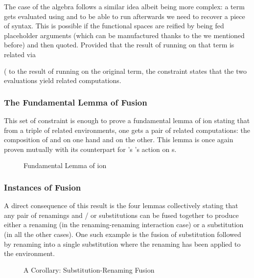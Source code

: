 
The case of the algebra follows a similar idea albeit being more complex:
a term gets evaluated using  and to be able to run 
afterwards we need to recover a piece of syntax. This is possible if the
 functional spaces are reified by being fed placeholder  arguments
(which can be manufactured thanks to the  we mentioned before) and
then quoted. Provided that the result of running  on that term is
related via {   (   to the result
of running  on the original term, the  constraint states
that the two evaluations yield related computations.


\subsubsection{The Fundamental Lemma of Fusion}

This set of constraint is enough to prove a fundamental lemma of ion
stating that from a triple of related environments, one gets a pair of related
computations: the composition of  and  on one hand and
 on the other. This lemma is once again proven mutually with its
counterpart for \semrec{}'s 's action on s.

\begin{figure}[h]
\caption{Fundamental Lemma of ion}
\end{figure}

\subsubsection{Instances of Fusion}

A direct consequence of this result is the four lemmas collectively stating
that any pair of renamings and / or substitutions can be fused together to
produce either a renaming (in the renaming-renaming interaction case) or a
substitution (in all the other cases). One such example is the fusion of
substitution followed by renaming into a single substitution where the
renaming has been applied to the environment.

\begin{figure}[h]
\caption{A Corollary: Substitution-Renaming Fusion}
\end{figure}

}
